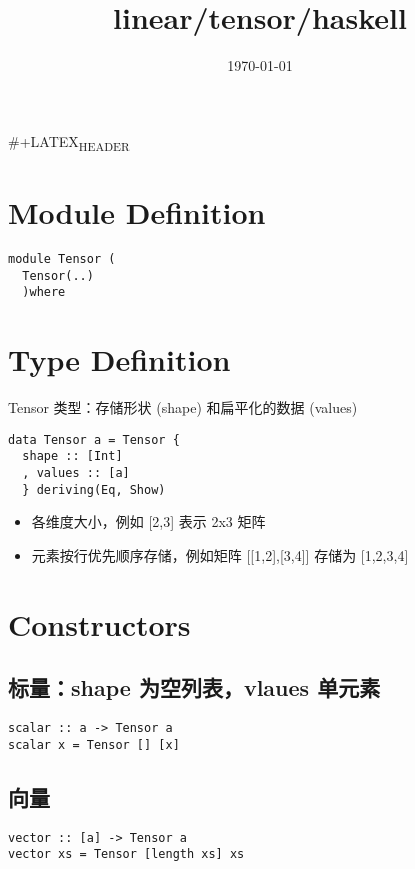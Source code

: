 \documentclass[11pt]{article}
\date{\today}
\title{linear/tensor/haskell}
\begin{document}
\maketitle
\tableofcontents

\#+LATEX\textsubscript{HEADER} \usepackage{amsmath}

\section{Module Definition}
\label{sec:org9319b76}
\begin{verbatim}
module Tensor (
  Tensor(..)
  )where
\end{verbatim}

\section{Type Definition}
\label{sec:org50a87ea}

Tensor 类型：存储形状 (shape) 和扁平化的数据 (values)
\begin{verbatim}
data Tensor a = Tensor {
  shape :: [Int] 
  , values :: [a]
  } deriving(Eq, Show)

\end{verbatim}
\begin{itemize}
\item 各维度大小，例如 [2,3] 表示 2x3 矩阵
\item 元素按行优先顺序存储，例如矩阵 [[1,2],[3,4]] 存储为 [1,2,3,4]
\end{itemize}


\section{Constructors}
\label{sec:org6d2c36f}

\subsection{标量：shape 为空列表，vlaues 单元素}
\label{sec:org4a9cdbe}
\begin{verbatim}
scalar :: a -> Tensor a
scalar x = Tensor [] [x]
\end{verbatim}

\subsection{向量}
\label{sec:org9ce4ca5}
\begin{verbatim}
vector :: [a] -> Tensor a
vector xs = Tensor [length xs] xs
\end{verbatim}
\end{document}
